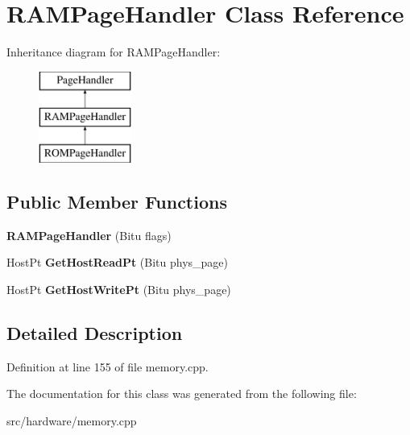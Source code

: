 \hypertarget{classRAMPageHandler}{\section{R\-A\-M\-Page\-Handler Class Reference}
\label{classRAMPageHandler}
}
Inheritance diagram for R\-A\-M\-Page\-Handler\-:\begin{figure}[H]
\begin{center}
\leavevmode
\includegraphics[height=3.000000cm]{classRAMPageHandler}
\end{center}
\end{figure}
\subsection*{Public Member Functions}
\begin{DoxyCompactItemize}
\item 
\hypertarget{classRAMPageHandler_a1a9d31214da07316be390b315bd48344}{{\bfseries R\-A\-M\-Page\-Handler} (Bitu flags)}\label{classRAMPageHandler_a1a9d31214da07316be390b315bd48344}

\item 
\hypertarget{classRAMPageHandler_aa96438cf48e183202b6d9bdef1ff858a}{Host\-Pt {\bfseries Get\-Host\-Read\-Pt} (Bitu phys\-\_\-page)}\label{classRAMPageHandler_aa96438cf48e183202b6d9bdef1ff858a}

\item 
\hypertarget{classRAMPageHandler_a08d7b2d963c5afb626c6aea199bc3a1b}{Host\-Pt {\bfseries Get\-Host\-Write\-Pt} (Bitu phys\-\_\-page)}\label{classRAMPageHandler_a08d7b2d963c5afb626c6aea199bc3a1b}

\end{DoxyCompactItemize}


\subsection{Detailed Description}


Definition at line 155 of file memory.\-cpp.



The documentation for this class was generated from the following file\-:\begin{DoxyCompactItemize}
\item 
src/hardware/memory.\-cpp\end{DoxyCompactItemize}

